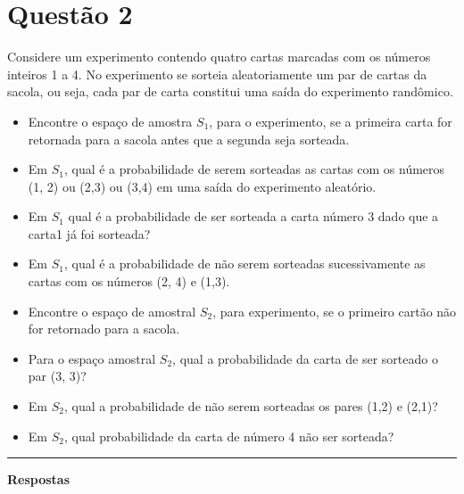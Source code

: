 \documentclass{article}
\begin{document}
\newpage

\section*{\sffamily Questão 2}
Considere um experimento contendo quatro cartas marcadas com os números inteiros 1 a 4. No
experimento se sorteia aleatoriamente um par de cartas da sacola, ou seja, cada par de carta constitui uma saída do experimento randômico.

\begin{itemize}
\item [a)] Encontre o espaço de amostra $S_1$, para o experimento, se a primeira carta for retornada para a sacola antes que a segunda seja sorteada.

\item [b)] Em $S_1$, qual é a probabilidade de serem sorteadas as cartas com os números (1, 2) ou (2,3) ou (3,4) em uma saída do experimento aleatório.

\item [c)] Em $S_1$ qual é a probabilidade de ser sorteada a carta número 3 dado que a carta1 já foi sorteada?

\item [d)] Em $S_1$, qual é a probabilidade de não serem sorteadas sucessivamente as cartas com os números (2, 4)
e (1,3).

\item [e)] Encontre o espaço de amostral $S_2$, para experimento, se o primeiro cartão não for retornado para a
sacola.

\item [f)] Para o espaço amostral $S_2$, qual a probabilidade da carta de ser sorteado o par (3, 3)?
\item [g)] Em $S_2$, qual a probabilidade de não serem sorteadas os pares (1,2) e (2,1)?
\item [h)] Em $S_2$, qual probabilidade da carta de número 4 não ser sorteada?
\end{itemize}
\rule{\linewidth}{0.5pt}

\textbf{\sffamily Respostas}
\end{document}
